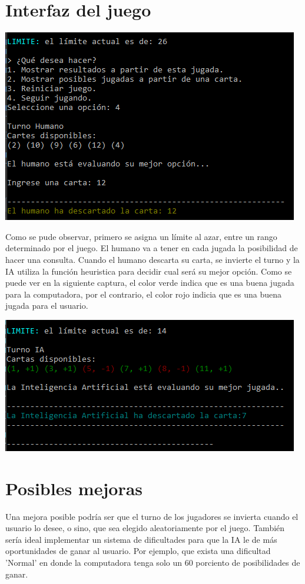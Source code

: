 \documentclass[12pt,a4paper]{article}
\begin{document}
\section{Interfaz del juego}
\begin{center}
\includegraphics[scale=0.7]{captura1.PNG} 
\end{center}
Como se pude observar, primero se asigna un límite al azar, entre un rango determinado por el juego. El humano va a tener en cada jugada la posibilidad de hacer una consulta. Cuando el humano descarta su carta, se invierte el turno y la IA utiliza la función heuristica para decidir cual será su mejor opción. Como se puede ver en la siguiente captura, el color verde indica que es una buena jugada para la computadora, por el contrario, el color rojo indicia que es una buena jugada para el usuario.

\begin{center}
\includegraphics[scale=0.7]{captura2.PNG} 
\end{center}
\newpage
\section{Posibles mejoras}
Una mejora posible podría ser que el turno de los jugadores se invierta cuando el usuario lo desee, o sino, que sea elegido aleatoriamente por el juego. También sería ideal implementar un sistema de dificultades para que la IA le de más oportunidades de ganar al usuario. Por ejemplo, que exista una dificultad 'Normal' en donde la computadora tenga solo un 60 porciento de posibilidades de ganar.
\end{document}
